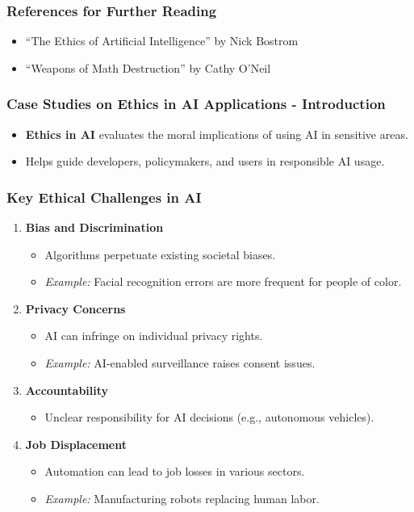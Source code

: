\documentclass[aspectratio=169]{beamer}
\begin{document}
\begin{frame}[fragile]
    \frametitle{References for Further Reading}
    \begin{itemize}
        \item “The Ethics of Artificial Intelligence” by Nick Bostrom
        \item “Weapons of Math Destruction” by Cathy O'Neil
    \end{itemize}
\end{frame}

\begin{frame}[fragile]
    \frametitle{Case Studies on Ethics in AI Applications - Introduction}
    \begin{itemize}
        \item \textbf{Ethics in AI} evaluates the moral implications of using AI in sensitive areas.
        \item Helps guide developers, policymakers, and users in responsible AI usage.
    \end{itemize}
\end{frame}

\begin{frame}[fragile]
    \frametitle{Key Ethical Challenges in AI}
    \begin{enumerate}
        \item \textbf{Bias and Discrimination} 
            \begin{itemize}
                \item Algorithms perpetuate existing societal biases.
                \item \textit{Example:} Facial recognition errors are more frequent for people of color.
            \end{itemize}
        \item \textbf{Privacy Concerns} 
            \begin{itemize}
                \item AI can infringe on individual privacy rights.
                \item \textit{Example:} AI-enabled surveillance raises consent issues.
            \end{itemize}
        \item \textbf{Accountability} 
            \begin{itemize}
                \item Unclear responsibility for AI decisions (e.g., autonomous vehicles).
            \end{itemize}
        \item \textbf{Job Displacement} 
            \begin{itemize}
                \item Automation can lead to job losses in various sectors.
                \item \textit{Example:} Manufacturing robots replacing human labor.
            \end{itemize}
    \end{enumerate}
\end{frame}
\end{document}
